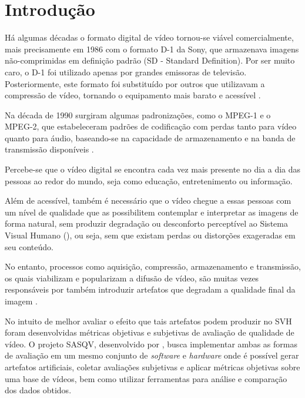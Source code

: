 
\chapter{Introdução}





Há algumas décadas o formato digital de vídeo tornou-se viável comercialmente, mais precisamente em 1986 com o formato D-1 da Sony, que armazenava imagens não-comprimidas em definição padrão (SD - Standard Definition). Por ser muito caro, o D-1 foi utilizado apenas por grandes emissoras de televisão. Posteriormente, este formato foi substituído por outros que utilizavam a compressão de vídeo, tornando o equipamento mais barato e acessível \cite{wikidigitalvideo}.

Na década de 1990 surgiram algumas padronizações, como o MPEG-1 e o MPEG-2, que estabeleceram padrões de codificação com perdas tanto para vídeo quanto para áudio, baseando-se na capacidade de armazenamento e na banda de transmissão disponíveis \cite{mpeg2ref}.

Percebe-se que o vídeo digital se encontra cada vez mais presente no dia a dia das pessoas ao redor do mundo, seja como educação, entretenimento ou informação.

Além de acessível, também é necessário que o vídeo chegue a essas pessoas com um nível de qualidade que as possibilitem contemplar e interpretar as imagens de forma natural, sem produzir degradação ou desconforto perceptível ao Sistema Visual Humano (), ou seja, sem que existam perdas ou distorções exageradas em seu conteúdo.

No entanto, processos como aquisição, compressão, armazenamento e transmissão, os quais viabilizam e popularizam a difusão de vídeo, são muitas vezes responsáveis por também introduzir artefatos que degradam a qualidade final da imagem \cite{daronco, wangbovik2004}.

No intuito de melhor avaliar o efeito que tais artefatos podem produzir no SVH foram desenvolvidas métricas objetivas e subjetivas de avaliação de qualidade de vídeo. O projeto SASQV, desenvolvido por \cite{sasqv}, busca implementar ambas as formas de avaliação em um mesmo conjunto de \emph{software} e \emph{hardware} onde é possível gerar artefatos artificiais, coletar avaliações subjetivas e aplicar métricas objetivas sobre uma base de vídeos, bem como utilizar ferramentas para análise e comparação dos dados obtidos.

